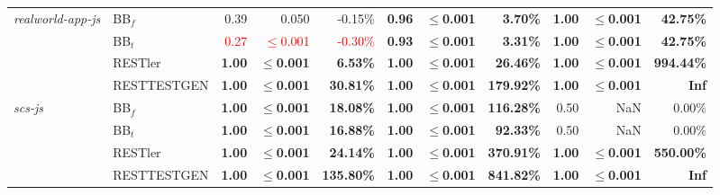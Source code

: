 \begin{tabular}{ l l r r r |r r r |r r r}
\emph{realworld-app-js} & BB$_f$ & 0.39 & 0.050 & -0.15\% & \textbf{0.96} & \textbf{$\le $0.001} & \textbf{3.70\%} & \textbf{1.00} & \textbf{$\le $0.001} & \textbf{42.75\%} \\ 
 & BB$_t$ & \textcolor{red}{0.27} & \textcolor{red}{$\le $0.001} & \textcolor{red}{-0.30\%} & \textbf{0.93} & \textbf{$\le $0.001} & \textbf{3.31\%} & \textbf{1.00} & \textbf{$\le $0.001} & \textbf{42.75\%} \\ 
 & RESTler & \textbf{1.00} & \textbf{$\le $0.001} & \textbf{6.53\%} & \textbf{1.00} & \textbf{$\le $0.001} & \textbf{26.46\%} & \textbf{1.00} & \textbf{$\le $0.001} & \textbf{994.44\%} \\ 
 & RESTTESTGEN & \textbf{1.00} & \textbf{$\le $0.001} & \textbf{30.81\%} & \textbf{1.00} & \textbf{$\le $0.001} & \textbf{179.92\%} & \textbf{1.00} & \textbf{$\le $0.001} & \textbf{Inf} \\ 
\emph{scs-js} & BB$_f$ & \textbf{1.00} & \textbf{$\le $0.001} & \textbf{18.08\%} & \textbf{1.00} & \textbf{$\le $0.001} & \textbf{116.28\%} & 0.50 & NaN & 0.00\% \\ 
 & BB$_t$ & \textbf{1.00} & \textbf{$\le $0.001} & \textbf{16.88\%} & \textbf{1.00} & \textbf{$\le $0.001} & \textbf{92.33\%} & 0.50 & NaN & 0.00\% \\ 
 & RESTler & \textbf{1.00} & \textbf{$\le $0.001} & \textbf{24.14\%} & \textbf{1.00} & \textbf{$\le $0.001} & \textbf{370.91\%} & \textbf{1.00} & \textbf{$\le $0.001} & \textbf{550.00\%} \\ 
 & RESTTESTGEN & \textbf{1.00} & \textbf{$\le $0.001} & \textbf{135.80\%} & \textbf{1.00} & \textbf{$\le $0.001} & \textbf{841.82\%} & \textbf{1.00} & \textbf{$\le $0.001} & \textbf{Inf} \\ 
\bottomrule 
\end{tabular} 
